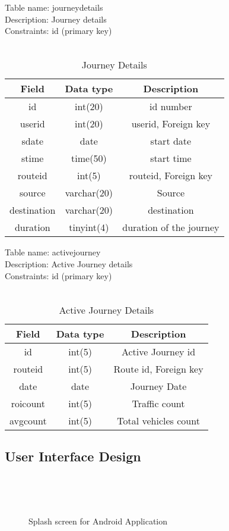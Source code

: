 Table name: journeydetails\\
Description: Journey details\\
Constraints: id (primary key)\\
\\
\begin{table}[ht]
\begin{tabular}{|c|c|c|} 
\hline
Field  & Data type & Description \\  
\hline
id& int(20)& id number \\ 
\hline
userid &  int(20) & userid, Foreign key \\
\hline
sdate&  date & start date \\
\hline
stime &  time(50) & start time \\
\hline
routeid &  int(5) & routeid, Foreign key \\
\hline
source &  varchar(20) & Source \\
\hline
destination &  varchar(20) & destination \\
\hline
duration &  tinyint(4) & duration of the journey \\
\hline
\end{tabular}
\caption{Journey Details }
\end{table}


Table name: activejourney\\
Description: Active Journey details\\
Constraints: id (primary key)\\
\\
\begin{table}[ht]
\begin{tabular}{|c|c|c|} 
\hline
Field  & Data type & Description \\  
\hline
id & int(5)& Active Journey id \\ 
\hline
routeid &  int(5) & Route id, Foreign key \\
\hline
date&  date & Journey Date \\
\hline
roicount&  int(5) & Traffic count \\
\hline
avgcount&  int(5) & Total vehicles count \\
\hline
\end{tabular}
\caption{Active Journey Details}
\end{table}

\newpage
\subsection{User Interface Design}
\\
\begin{figure}[ht]
{}\\
\caption{Splash screen for Android Application}
\end{figure}\\



